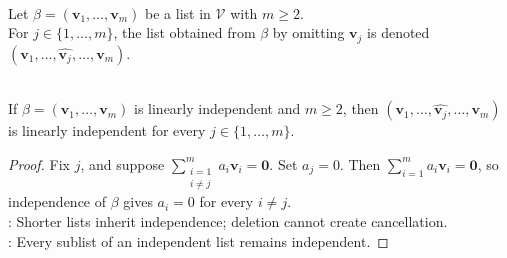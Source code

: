 \begin{definition} \\
Let $\beta=(\mathbf{v}_1,\ldots,\mathbf{v}_m)$ be a list in $\mathcal{V}$ with $m\geq 2$.\\
For $j\in\{1,\ldots,m\}$, the list obtained from $\beta$ by omitting $\mathbf{v}_j$ is denoted $(\mathbf{v}_1,\ldots,\widehat{\mathbf{v}_j},\ldots,\mathbf{v}_m)$.
\end{definition}

\begin{proposition} \label{prop:omittingfromindependentlist} \\
If $\beta=(\mathbf{v}_1,\ldots,\mathbf{v}_m)$ is linearly independent and $m\geq 2$, then $(\mathbf{v}_1,\ldots,\widehat{\mathbf{v}_j},\ldots,\mathbf{v}_m)$ is linearly independent for every $j\in\{1,\ldots,m\}$.
\begin{proof}
Fix $j$, and suppose $\sum\limits_{\substack{i=1\\ i\neq j}}^m a_i\mathbf{v}_i=\mathbf{0}$. Set $a_j=0$. Then $\sum\limits_{i=1}^m a_i\mathbf{v}_i=\mathbf{0}$, so independence of $\beta$ gives $a_i=0$ for every $i\neq j$.\\
: Shorter lists inherit independence; deletion cannot create cancellation.\\
: Every sublist of an independent list remains independent.
\end{proof}
\end{proposition}

